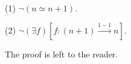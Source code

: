 (1) $\neg(n \simeq n + 1)$.

(2) $\neg(\exists f)[f: (n + 1) \xrightarrow{1-1} n]$.

The proof is left to the reader.
